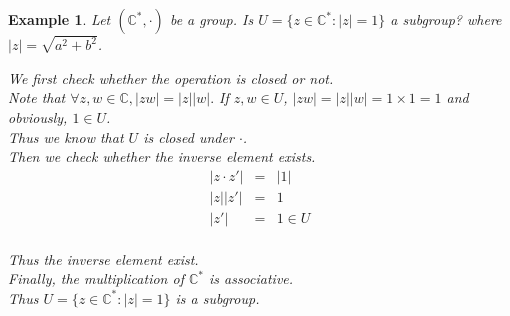 \documentclass{article}
\theoremstyle{MyNonumberplain}
\theoremstyle{break}
\theoremstyle{break}
\newtheorem{example}{Example}[section]
\theoremstyle{break}
\theoremstyle{definition}
\theoremstyle{break}
\begin{document}
\begin{expbox}
    \begin{example}
                Let $(\mathbb{C}^{\ast}, \cdot)$ be a group. Is $U = \{ z \in
        \mathbb{C}^{\ast} : | z | = 1 \}$ a subgroup? where $| z | = \sqrt{a^2 +
        b^2}$.
        \begin{ansbox}
            We first check whether the operation is closed or not.\\

            Note that $\forall z, w \in \mathbb{C}, | z w | = | z | | w | .$ If $z, w \in
            U$, $| z w | = | z |  | w | = 1 \times 1 = 1$ and obviously, $1 \in U$.\\
    
            Thus we know that $U$ is closed under $\cdot$.\\
    
            Then we check whether the inverse element exists.\\
            \begin{eqnarray*}
            | z \cdot z' | & = & | 1 |\\
            | z |  | z' | & = & 1\\
            | z' | & = & 1 \in U
            \end{eqnarray*}\\
            Thus the inverse element exist.\\
    
            Finally, the multiplication of $\mathbb{C}^{\ast}$ is associative.\\
    
            Thus $U = \{ z \in \mathbb{C}^{\ast} : | z | = 1 \}$ is a subgroup.
    
        \end{ansbox}

    \end{example}
\end{expbox}
\end{document}
